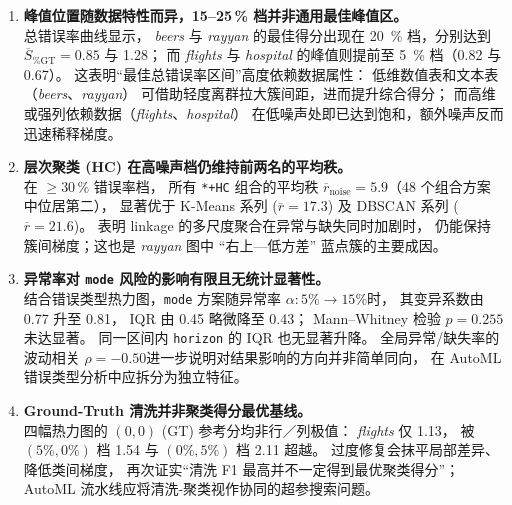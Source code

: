 \documentclass[10pt]{article} %
\numberwithin{equation}{section}
\begin{document}
\begin{enumerate}[label=\textbf{\arabic*.},leftmargin=2.4em]

\item \textbf{峰值位置随数据特性而异，15–25\,\% 档并非通用最佳峰值区。}\\
总错误率曲线显示，%
\textit{beers} 与 \textit{rayyan} 的最佳得分出现在
\SI{20}{\percent} 档，分别达到
\(\overline{S}_{\%\mathrm{GT}}=\num{0.85}\) 与 \num{1.28}；
而 \textit{flights} 与 \textit{hospital} 的峰值则提前至
\SI{5}{\percent} 档（\num{0.82} 与 \num{0.67}）。
这表明“最佳总错误率区间”高度依赖数据属性：
低维数值表和文本表（\textit{beers}、\textit{rayyan}）
可借助轻度离群拉大簇间距，进而提升综合得分；
而高维或强列依赖数据（\textit{flights}、\textit{hospital}）
在低噪声处即已达到饱和，额外噪声反而迅速稀释梯度。


\item \textbf{层次聚类 (HC) 在高噪声档仍维持前两名的平均秩。}\\
在 \(\ge\!30\,\%\) 错误率档，  
所有 \texttt{*+HC} 组合的平均秩
\(\overline{r}_{\text{noise}}=\num{5.9}\)（48 个组合方案中位居第二），  
显著优于 K-Means 系列 (\(\overline{r}=17.3\)) 及 DBSCAN 系列 (\(\overline{r}=21.6\))。  
表明 linkage 的多尺度聚合在异常与缺失同时加剧时，
仍能保持簇间梯度；这也是 \emph{rayyan} 图中
“右上—低方差” 蓝点簇的主要成因。

\item \textbf{异常率对 \texttt{mode} 风险的影响有限且无统计显著性。}\\
结合错误类型热力图，\texttt{mode} 方案随异常率
\(\alpha:5\%\!\to\!15\%\)时，
其变异系数由 \num{0.77} 升至 \num{0.81}，
IQR 由 \num{0.45} 略微降至 \num{0.43}；
Mann–Whitney 检验 \(p=\num{0.255}\) 未达显著。
同一区间内 \texttt{horizon} 的 IQR 也无显著升降。
全局异常/缺失率的波动相关
\(\rho=-\num{0.50}\)进一步说明对结果影响的方向并非简单同向，
在 AutoML 错误类型分析中应拆分为独立特征。

\item \textbf{Ground-Truth 清洗并非聚类得分最优基线。}\\
四幅热力图的 \((0,0)\) (GT) 参考分均非行／列极值：  
\textit{flights} 仅 \num{1.13}，
被 \((5\%,0\%)\) 档 \num{1.54} 与 \((0\%,5\%)\) 档 \num{2.11} 超越。  
过度修复会抹平局部差异、降低类间梯度，
再次证实“清洗 F1 最高并不一定得到最优聚类得分”；  
AutoML 流水线应将清洗-聚类视作协同的超参搜索问题。

\end{enumerate}
\end{document}
